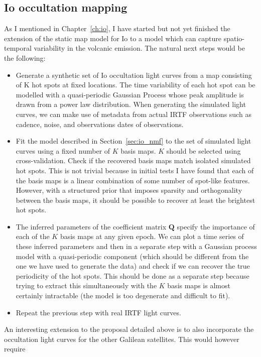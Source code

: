 \documentclass[12pt,dvipsnames]{report}
\renewcommand{\vec}[1]{\boldsymbol{\mathbf{#1}}}
\begin{document}
\subsection{Io occultation mapping}
As I mentioned in Chapter~\ref{ch:io}, I have started but not yet finished the extension
of the static map model for Io to a model which can capture spatio-temporal variability 
in the volcanic emission. The natural next steps would be the following:
\begin{itemize}
    \item  Generate a synthetic set of Io occultation light curves from a map consisting 
    of K hot spots at fixed locations. The time variability of each hot spot can be modelled 
    with a quasi-periodic Gaussian Process whose peak amplitude is drawn from a power law 
    distribution. When generating the simulated light curves, we can make use of metadata from 
    actual IRTF observations such as cadence, noise, and observations dates of observations.
    \item Fit the model described in Section~\ref{sec:io_nmf} to the set of simulated light 
    curves using a fixed number of $K$ basis maps. $K$ should be selected using cross-validation. 
    Check if the recovered basis maps match isolated simulated hot spots. 
    This is not trivial because in initial tests I have found that each of the basis maps 
    is a linear combination of some number of spot-like features. However, with a structured 
    prior that imposes sparsity and orthogonality between the basis maps, it should be 
    possible to recover at least the brightest hot spots.
    \item The inferred parameters of the coefficient matrix $\vec Q$ specify the importance 
    of each of the $K$ basis maps at any given epoch. We can plot a time series of these 
    inferred parameters and then in a separate step with a Gaussian process model with 
    a quasi-periodic component (which should be different from the one we have used to 
    generate the data) and check if we can recover the true periodicity of the hot spots.
    This should be done as a separate step because trying to extract this 
    simultaneously with the $K$ basis maps is almost certainly intractable (the model 
    is too degenerate and difficult to fit).
    \item Repeat the previous step with real IRTF light curves.
\end{itemize}
An interesting extension to the proposal detailed above is to also incorporate the 
occultation light curves for the other Galilean satellites. This would however require 
\end{document}
